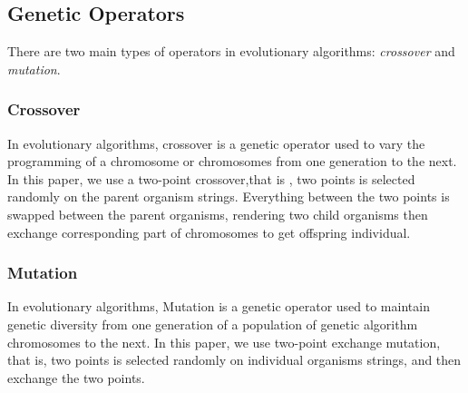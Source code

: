 \subsection{Genetic Operators}
%

There are two main types of operators in evolutionary algorithms:
\emph{crossover} and \emph{mutation}.

\subsubsection{Crossover}
In evolutionary algorithms, crossover is a genetic operator used to vary the
programming of a chromosome or chromosomes from one generation to the next.  In
this paper, we use a two-point crossover,that is , two points is selected
randomly on the parent organism strings. Everything between the two points is
swapped between the parent organisms, rendering two child organisms then
exchange corresponding part of chromosomes to get offspring individual.


\subsubsection{Mutation}
In evolutionary algorithms, Mutation is a genetic operator used to maintain
genetic diversity from one generation of a population of genetic algorithm
chromosomes to the next.  In this paper, we use two-point exchange mutation,
that is, two points is selected randomly on individual organisms strings, and
then exchange the two points.
